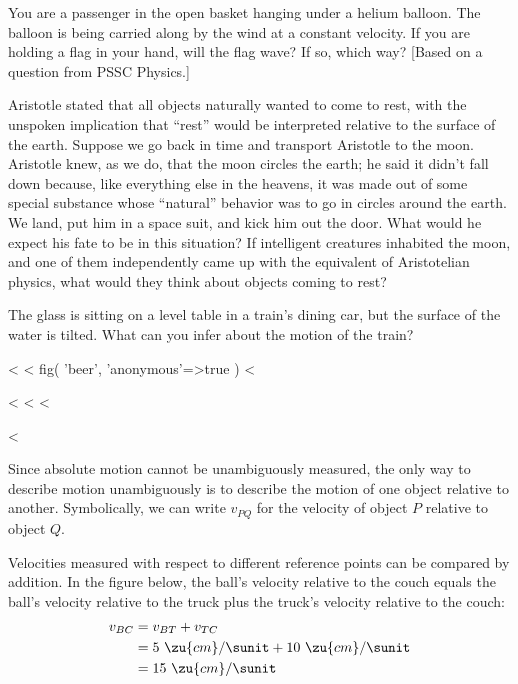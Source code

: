 \begin{dq}\label{dq:flag-in-balloon}
You are a passenger in the open basket hanging under a
helium balloon. The balloon is being carried along by the
wind at a constant velocity. If you are holding a flag in
your hand, will the flag wave? If so, which way? [Based on a
question from PSSC Physics.]
\end{dq}

\begin{dq}
Aristotle stated that all objects naturally wanted to
come to rest, with the unspoken implication that ``rest''
would be interpreted relative to the surface of the earth.
Suppose we go back in time and transport Aristotle to the
moon. Aristotle knew, as we do, that the moon circles the
earth; he said it didn't fall down because, like everything
else in the heavens, it was made out of some special
substance whose ``natural'' behavior was to go in circles
around the earth. We land, put him in a space suit, and kick
him out the door. What would he expect his fate to be in
this situation? If intelligent creatures inhabited the moon,
and one of them independently came up with the equivalent of
Aristotelian physics, what would they think about objects coming to rest?
\end{dq}

\begin{dq}\label{dq:beer}
The glass is sitting on a level table in a train's
dining car, but the surface of the water is tilted. What can
you infer about the motion of the train?
\end{dq}
<%
<%
  fig(
    'beer',
    {
      'anonymous'=>true
    }
  )
<%

<%
<%
<%

<%

Since absolute motion cannot be unambiguously measured, the
only way to describe motion unambiguously is to describe the
motion of one object relative to another. Symbolically, we
can write $v_{PQ}$ for the velocity of object $P$ relative to object $Q$.

Velocities measured with respect to different reference
points can be compared by addition. In the figure below, the
ball's velocity relative to the couch equals the ball's
velocity relative to the truck plus the truck's velocity
relative to the couch:
\begin{align*}
      v_{BC}   &=  v_{BT}+v_{TC}  \\
         &=  5\ \zu{cm}/\sunit + 10\ \zu{cm}/\sunit \\
         &=  15\ \zu{cm}/\sunit
\end{align*}

